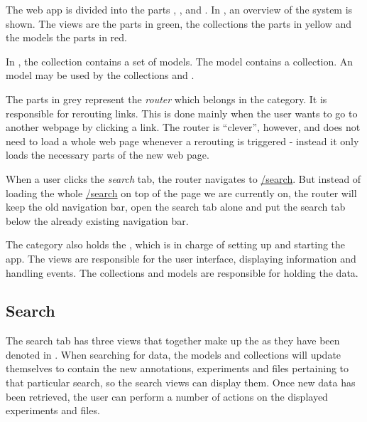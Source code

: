 The web app is divided into the parts , ,  and . In , an overview of the system is shown. The views are the parts in green, the collections the parts in yellow and the models the parts in red. 

\begin{example}
In , the collection  contains a set of  models. The model  contains a  collection. An  model may be used by the collections  and .
\end{example}

The parts in grey represent the \textit{router} which belongs in the  category. It is responsible for rerouting links. This is done mainly when the user wants to go to another webpage by clicking a link. The router is “clever”, however, and does not need to load a whole web page whenever a rerouting is triggered - instead it only loads the necessary parts of the new web page.

\begin{example}
When a user clicks the \textit{search} tab, the router navigates to \url{/search}. But instead of loading the whole \url{/search} on top of the page we are currently on, the router will keep the old navigation bar, open the search tab alone and put the search tab below the already existing navigation bar.
\end{example}

The  category also holds the , which is in charge of setting up and starting the app. The views are responsible for the user interface, displaying information and handling events. The collections and models are responsible for holding the data.

\label{sec:web_search}
\subsection{Search}
The search tab has three views that together make up the  as they have been denoted in . When searching for data, the models and collections will update themselves to contain the new annotations, experiments and files pertaining to that particular search, so the search views can display them. Once new data has been retrieved, the user can perform a number of actions on the displayed experiments and files. 

